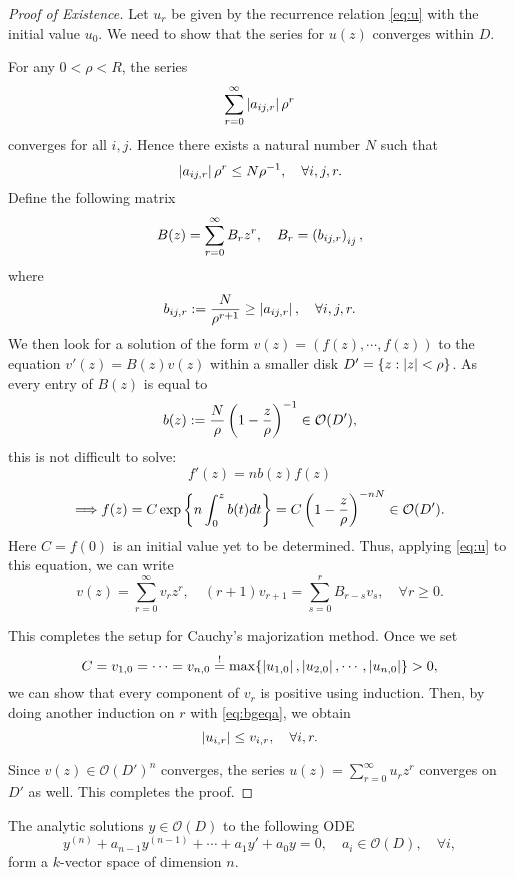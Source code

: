 \documentclass{article}
\begin{document}
\begin{proof}[Proof of Existence]
    Let $u_r$ be given by the recurrence relation \eqref{eq:u} with the initial value $u_0$. We need to show that the series for $u(z)$ converges within $D$.
    
    For any $0<\rho<R$, the series
    \[
        \sum_{r=0}^\infty \left\vert a_{ij,r}\right\vert \rho^r
    \]
    converges for all $i,j$. Hence there exists a natural number $N$ such that
    \[
        \left\vert a_{ij,r}\right\vert \rho^r\leq N\rho^{-1},\quad\forall i,j,r.
    \]
    Define the following matrix
    \[
        B(z)=\sum_{r=0}^\infty B_r z^r,\quad B_r=\left(b_{ij,r}\right)_{ij},
    \]
    where
    \begin{equation}\label{eq:bgeqa}
        b_{ij,r}:=\frac{N}{\rho^{r+1}}\geq\left\vert a_{ij,r}\right\vert,\quad\forall i,j,r.
    \end{equation}
    We then look for a solution of the form $v(z)=(f(z),\cdots,f(z))$ to the equation $v'(z)=B(z)v(z)$ within a smaller disk $D'=\left\{z:\left\vert z\right\vert<\rho\right\}$. As every entry of $B(z)$ is equal to 
    \[
        b(z):=\frac{N}{\rho}\left(1-\frac{z}{\rho}\right)^{-1}\in\mathcal{O}(D'),
    \]
    this is not difficult to solve:
    \[
        f'(z)=n b(z) f(z)
    \]
    \[    
        \Longrightarrow f(z)=C\exp\left\{n\int_0^z b(t)dt\right\}=C\left(1-\frac{z}{\rho}\right)^{-nN} \in\mathcal{O}(D').
    \]
    Here $C=f(0)$ is an initial value yet to be determined. Thus, applying \eqref{eq:u} to this equation, we can write
    \begin{equation*}
        v(z)=\sum_{r=0}^\infty v_r z^r,\quad (r+1) v_{r+1}=\sum_{s=0}^r B_{r-s} v_s,\quad\forall r\geq 0.
    \end{equation*}

    This completes the setup for Cauchy's majorization method. Once we set 
    \[
        C=v_{1,0}=\cdots=v_{n,0}\overset{!}{=}\max\{\left\vert u_{1,0}\right\vert,\left\vert u_{2,0}\right\vert,\cdots,\left\vert u_{n,0}\right\vert\}>0,
    \]
    we can show that every component of $v_r$ is positive using induction. Then, by doing another induction on $r$ with \eqref{eq:bgeqa}, we obtain
    \[
        \left\vert u_{i,r}\right\vert\leq v_{i,r},\quad\forall i,r.
    \]

    Since $v(z)\in\mathcal{O}(D')^n$ converges, the series $u(z)=\sum_{r=0}^\infty u_rz^r$ converges on $D'$ as well. This completes the proof.
\end{proof}

\begin{corollary}
    The analytic solutions $y\in\mathcal{O}(D)$ to the following ODE
    \[
        y^{(n)}+a_{n-1}y^{(n-1)}+\cdots+a_1y'+a_0y=0,\quad a_i\in\mathcal{O}(D),\quad\forall i,
    \]
    form a $k$-vector space of dimension $n$.
\end{corollary}
\end{document}
